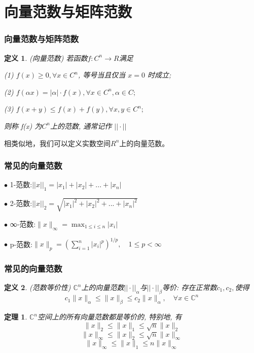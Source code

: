 \documentclass[notheorems,serif]{beamer}
\newcommand{\hei}[1]{{\HEI#1}}
\newtheorem{theorem}{\hei{定理}}
\newtheorem{definition}{\hei{定义}}
\begin{document}
\section{向量范数与矩阵范数}
\begin{frame}
\frametitle{向量范数与矩阵范数}
\begin{definition}(向量范数)
	若函数$f : C^n \to R $满足
	
	(1) $f(x) \geq 0, ∀ x \in C^n$, 等号当且仅当 $x = 0$ 时成立;
	
	(2) $f(\alpha x) = |\alpha| · f(x), ∀ x \in C^{n}, α \in C;$
	
	(3) $f(x + y) \leq f(x) + f(y), ∀x, y \in C^{n};$
	
	则称 f(x) 为$C^{n}$上的范数, 通常记作 $|| \cdot ||$
\end{definition}

相类似地，我们可以定义实数空间$R^n$上的向量范数。
\end{frame}

\begin{frame}

\frametitle{常见的向量范数}
$\bullet$ 1-范数:$||x||_1=|x_1|+|x_2|+...+|x_n|$

$\bullet$ 2-范数:$||x||_2=\sqrt{|x_1|^2+|x_2|^2+...+|x_n|^2}$

$\bullet$ ∞-范数:$\|x\|_{\infty}=\max _{1 \leq i \leq n}\left|x_{i}\right|$

$\bullet$ p-范数:$\|x\|_{p}=\left(\sum_{i=1}^{n}\left|x_{i}\right|^{p}\right)^{1 / p}, \quad 1 \leq p<\infty$
\end{frame}

\begin{frame}
\frametitle{常见的向量范数}
\begin{definition}(范数等价性)
	$\mathbb{C}^{n}$上的向量范数$||\cdot||_{\alpha}$与$||\cdot||_{\beta}$等价: 存在正常数$c_1, c_2,$使得
	$$c_{1}\|x\|_{\alpha} \leq\|x\|_{\beta} \leq c_{2}\|x\|_{\alpha}, \quad \forall x \in \mathbb{C}^{n}$$
\end{definition}

\begin{theorem}
	$\mathbb{C}^{n}$空间上的所有向量范数都是等价的, 特别地, 有
	$$
	\|x\|_{2} \leq\|x\|_{1} \leq \sqrt{n}\|x\|_{2}
	$$
	$$
	\|x\|_{\infty} \leq\|x\|_{2} \leq \sqrt{n}\|x\|_{\infty}
	$$
	$$
	\|x\|_{\infty} \leq\|x\|_{1} \leq n\|x\|_{\infty}
	$$
\end{theorem}
\end{frame}
\end{document}
